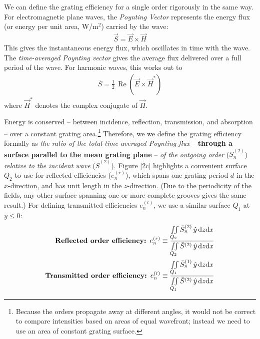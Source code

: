 We can define the grating efficiency for a single order rigorously in the same way.  For electromagnetic plane waves, the \emph{Poynting Vector} represents the energy flux (or energy per unit area, W/m$^2$) carried by the wave:
\begin{align}
\vec S = \vec E \times \vec H
\end{align}
This gives the instantaneous energy flux, which oscillates in time with the wave.  The \emph{time-averaged Poynting vector} gives the average flux delivered over a full period of the wave.  For harmonic waves, this works out to
\begin{align}
 \bar S  = \frac{1}{2}\, \operatorname{Re} \left( \vec E \times \vec H^\ast \right)
\end{align}
where $\vec H^\ast$ denotes the complex conjugate of $\vec H$.

Energy is conserved -- between incidence, reflection, transmission, and absorption -- over a constant grating area.\footnote{Because the orders propagate away at different angles, it would not be correct to compare intensities based on areas of equal wavefront; instead we need to use an area of constant grating surface.}  Therefore, we we define the grating efficiency formally as \emph{the ratio of the total time-averaged Poynting flux} -- \textbf{through a surface parallel to the mean grating plane} -- \emph{of the outgoing order }($\bar S_n^{(2)}$) \emph{relative to the incident wave} ($\bar S^{(2)}$).  Figure \ref{2c} highlights a convenient surface $Q_2$ to use for reflected efficiencies ($e_n^{(r)}$), which spans one grating period $d$ in the $x$-direction, and has unit length in the $z$-direction.  (Due to the periodicity of the fields, any other surface spanning one or more complete grooves gives the same result.)  For defining transmitted efficiencies $e_n^{(t)}$, we use a similar surface $Q_1$ at $y\leq0$:
\begin{align}
\textrm{\textbf{Reflected order efficiency: }}e_n^{(r)} &\equiv \frac{\iint \limits_{Q_2} \bar S_n^{(2)} \, \hat y \, \mathrm{d} z \mathrm{d} x}{ \iint \limits_{Q_2} \bar S^{(2)} \, \hat y \, \mathrm{d} z \mathrm{d} x} \\
\textrm{\textbf{Transmitted order efficiency: }}e_n^{(t)} &\equiv\frac{\iint \limits_{Q_1} \bar S_n^{(1)}\, \hat y \, \mathrm{d} z \mathrm{d} x}{ \iint \limits_{Q_1} \bar S^{(2)}\, \hat y \, \mathrm{d} z \mathrm{d} x}
\end{align}
          
